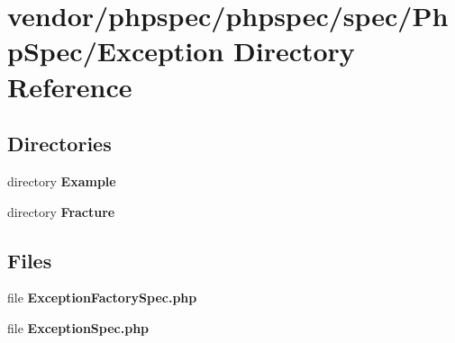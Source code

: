 \section{vendor/phpspec/phpspec/spec/\+Php\+Spec/\+Exception Directory Reference}
\label{dir_5748e8b3fbb854237c4b66f8d3d2e132}
\subsection*{Directories}
\begin{DoxyCompactItemize}
\item 
directory {\bf Example}
\item 
directory {\bf Fracture}
\end{DoxyCompactItemize}
\subsection*{Files}
\begin{DoxyCompactItemize}
\item 
file {\bf Exception\+Factory\+Spec.\+php}
\item 
file {\bf Exception\+Spec.\+php}
\end{DoxyCompactItemize}
